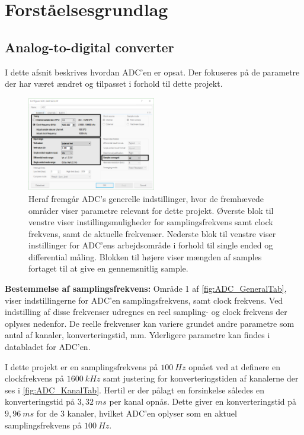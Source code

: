 \chapter{Forståelsesgrundlag}
\section{Analog-to-digital converter}
I dette afsnit beskrives hvordan ADC'en er opsat. Der fokuseres på de parametre der har været ændret og tilpasset i forhold til dette projekt.

\begin{figure}[H]
	\centering
	\includegraphics[width=0.5\textwidth]{figures/ADC_instillinger_edit.png}
	\caption{Heraf fremgår ADC's generelle indstillinger, hvor de fremhævede områder viser parametre relevant for dette projekt. Øverste blok til venstre viser instillingsmuligheder for samplingsfrekvens samt clock frekvens, samt de aktuelle frekvenser. Nederste blok til venstre viser instillinger for ADC'ens arbejdsområde i forhold til single ended og differential måling. Blokken til højere viser mængden af samples fortaget til at give en gennemsnitlig sample.}
	\label{fig:ADC_GeneralTab}
\end{figure}

\textbf{Bestemmelse af samplingsfrekvens:}
Område 1 af \autoref{fig:ADC_GeneralTab}, viser indstillingerne for ADC'en samplingsfrekvens, samt clock frekvens. Ved indstilling af disse frekvenser udregnes en reel sampling- og clock frekvens der oplyses nedenfor. De reelle frekvenser kan variere grundet andre parametre som antal af kanaler, konverteringstid, mm. Yderligere parametre kan findes i databladet for ADC'en. 

\noindent
I dette projekt er en samplingsfrekvens på $100~Hz$ opnået ved at definere en clockfrekvens på $1600~kHz$ samt justering for konverteringstiden af kanalerne der ses i \autoref{fig:ADC_KanalTab}. Hertil er der pålagt en forsinkelse således en konverteringstid på $3,32~ms$ per kanal opnås. Dette giver en konverteringstid på $9,96~ms$ for de 3 kanaler, hvilket ADC'en oplyser som en aktuel samplingsfrekvens på $100~Hz$. 

